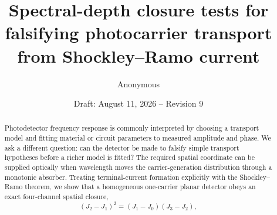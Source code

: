 \documentclass[11pt]{article}
\title{Spectral-depth closure tests for falsifying photocarrier transport from Shockley--Ramo current}
\author{Anonymous}
\date{Draft: August 11, 2026 -- Revision 9}
\begin{document}
\maketitle

\begin{abstract}
Photodetector frequency response is commonly interpreted by choosing a transport model and fitting material or circuit parameters to measured amplitude and phase. We ask a different question: can the detector be made to falsify simple transport hypotheses before a richer model is fitted? The required spatial coordinate can be supplied optically when wavelength moves the carrier-generation distribution through a monotonic absorber. Treating terminal-current formation explicitly with the Shockley--Ramo theorem, we show that a homogeneous one-carrier planar detector obeys an exact four-channel spatial closure,
\begin{equation*}
(J_2-J_1)^2=(J_1-J_0)(J_3-J_2),
\end{equation*}

\end{abstract}
\end{document}
